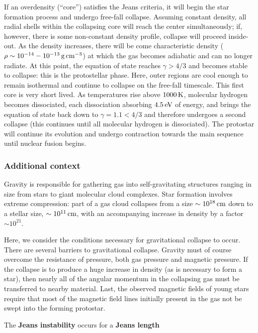\documentclass[a4paper,10pt]{article}
\begin{document}
If an overdensity (``core'') satisfies the Jeans criteria, it will begin the star formation process and undergo free-fall collapse. Assuming constant density, all radial shells within the collapsing core will reach the center simultaneously; if, however, there is some non-constant density profile, collapse will proceed inside-out. As the density increases, there will be come characteristic density ($\rho\sim10^{-14}-10^{-13}\,{\rm g\,cm^{-3}}$) at which the gas becomes adiabatic and can no longer radiate. At this point, the equation of state reaches $\gamma>4/3$ and becomes stable to collapse: this is the protostellar phase. Here, outer regions are cool enough to remain isothermal and continue to collapse on the free-fall timescale. This first core is very short lived. As temperatures rise above $1000\,{\rm K}$, molecular hydrogen becomes dissociated, each dissociation absorbing $4.5\,{\rm eV}$ of energy, and brings the equation of state back down to $\gamma=1.1<4/3$ and therefore undergoes a second collapse (this continues until all molecular hydrogen is dissociated). The protostar will continue its evolution and undergo contraction towards the main sequence until nuclear fusion begins.

\subsubsection{Additional context}

Gravity is responsible for gathering gas into self-gravitating structures ranging in size from stars to giant molecular cloud complexes. Star formation involves extreme compression: part of a gas cloud collapses from a size $\sim10^{18}\,{\rm cm}$ down to a stellar size, $\sim10^{11}\,{\rm cm}$, with an accompanying increase in density by a factor $\sim10^{21}$.

{\noindent}Here, we consider the conditions necessary for gravitational collapse to occur. There are several barriers to gravitational collapse. Gravity must of course overcome the resistance of pressure, both gas pressure and magnetic pressure. If the collapse is to produce a huge increase in density (as is necessary to form a star), then nearly all of the angular momentum in the collapsing gas must be transferred to nearby material. Last, the observed magnetic fields of young stars require that most of the magnetic field lines initially present in the gas not be swept into the forming protostar.

{\noindent}The \textbf{Jeans instability} occurs for a \textbf{Jeans length}
\end{document}
